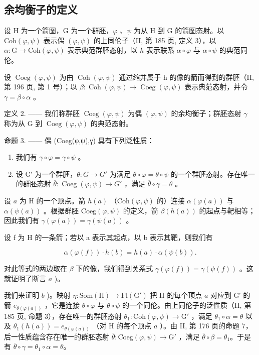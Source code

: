 \subsection{余均衡子的定义}

设 H 为一个箭图，G 为一个群胚，\(\varphi\) 、\(\psi\) 为从 H 到 G 的箭图态射。以 \(\mathrm{Coh}(\varphi,\psi)\) 表示偶 \((\varphi,\psi)\) 的上同伦子（II, 第 185 页, 定义 3），以 \(\alpha\colon\mathrm{G}\to\mathrm{Coh}(\varphi,\psi)\) 表示典范群胚态射，以 \(h\) 表示联系 \(\alpha\circ\varphi\) 与 \(\alpha\circ\psi\) 的典范同伦。

设 \(\operatorname{Coeg}(\varphi,\psi)\) 为由 \(\operatorname{Coh}(\varphi,\psi)\) 通过缩并属于 h 的像的箭而得到的群胚（II, 第 196 页, 第 1 号）；以 \(\beta\colon\operatorname{Coh}(\varphi,\psi)\to\operatorname{Coeg}(\varphi,\psi)\) 表示典范态射，并令 \(\gamma=\beta\circ\alpha\) 。

定义 2. —— 我们称群胚 \(\operatorname{Coeg}(\varphi,\psi)\) 为偶 \((\varphi,\psi)\) 的余均衡子；群胚态射 \(\gamma\) 称为从 G 到 \(\operatorname{Coeg}(\varphi,\psi)\) 的典范态射。

命题 3. —— 偶 (Coeg(φ,ψ),γ) 具有下列泛性质：

\begin{enumerate}
\def\labelenumi{\alph{enumi})}
\item
  我们有 \(\gamma \circ \varphi = \gamma \circ \psi\) 。
\item
  设 G′ 为一个群胚，\(\theta\colon G\to G'\) 为满足 \(\theta\circ\varphi=\theta\circ\psi\) 的一个群胚态射。存在唯一的群胚态射 \(\overline{\theta}\colon\operatorname{Coeg}(\varphi,\psi)\to G'\) ，满足 \(\overline{\theta}\circ\gamma=\theta\) 。
\end{enumerate}

设 \(a\) 为 H 的一个顶点。箭 \(h(a)\) （\(\mathrm{Coh}(\varphi, \psi)\) 的）连接 \(\alpha(\varphi(a))\) 与 \(\alpha(\psi(a))\) 。根据群胚 \(\mathrm{Coeg}(\varphi, \psi)\) 的定义，箭 \(\beta(h(a))\) 的起点与靶相等；因此我们有 \(\gamma(\varphi(a)) = \gamma(\psi(a))\) 。

设 f 为 H 的一条箭；若以 a 表示其起点，以 b 表示其靶，则我们有

\[
\alpha (\varphi (f)) \cdot h (b) = h (a) \cdot \alpha (\psi (b)).
\]

对此等式的两边取在 \(\beta\) 下的像，我们得到关系式 \(\gamma(\varphi(f)) = \gamma(\psi(f))\) 。这就证明了断言 \(a\) )。

我们来证明 \(b\) )。映射 \(\eta\colon\mathrm{Som}(\mathrm{H})\to\mathrm{Fl}(\mathrm{G}')\) 把 H 的每个顶点 \(a\) 对应到 G′ 的箭 \(e_{\theta(\varphi(a))}\) ，它是连接 \(\theta\circ\varphi\) 与 \(\theta\circ\psi\) 的一个同伦。由上同伦子的泛性质（II, 第 185 页, 命题 3），存在唯一的群胚态射 \(\theta_1\colon\mathrm{Coh}(\varphi,\psi)\to\mathrm{G}'\) ，满足 \(\theta_1\circ\alpha=\theta\) 以及 \(\theta_1(h(a))=e_{\theta(\varphi(a))}\) （对 H 的每个顶点 \(a\) ）。由 II, 第 176 页的命题 7，后一性质蕴含存在唯一的群胚态射 \(\overline{\theta}\colon\mathrm{Coeg}(\varphi,\psi)\to\mathrm{G}'\) ，满足 \(\overline{\theta}\circ\beta=\theta_1\)。于是有 \(\overline{\theta}\circ\gamma=\theta_1\circ\alpha=\theta\)。

